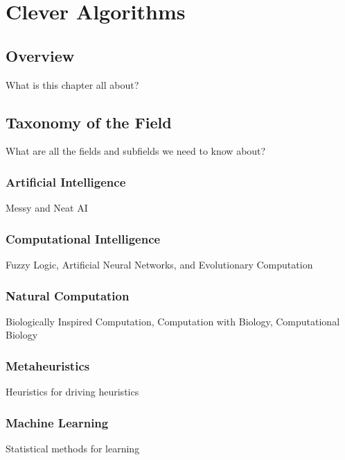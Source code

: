 


\chapter{Clever Algorithms}
\label{chap:field}

\section{Overview}
What is this chapter all about?


\section{Taxonomy of the Field}
What are all the fields and subfields we need to know about?

\subsection{Artificial Intelligence}
Messy and Neat AI

\subsection{Computational Intelligence}
Fuzzy Logic, Artificial Neural Networks, and Evolutionary Computation

\subsection{Natural Computation}
Biologically Inspired Computation, Computation with Biology, Computational Biology 

\subsection{Metaheuristics}
Heuristics for driving heuristics

\subsection{Machine Learning}
Statistical methods for learning



